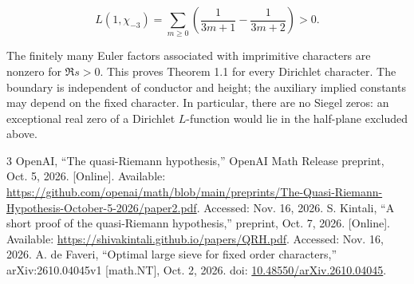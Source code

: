 \documentclass[reqno,a4paper,11pt]{amsart}
\begin{document}
\[
L\left( 1,{\chi }_{-3}\right) =\sum _{m\ge 0} \left( \frac{1}{3m+1}-\frac{1}{3m+2}\right) >0.
\]

The finitely many Euler factors associated with imprimitive characters are nonzero for $\Re s>0$. This proves Theorem 1.1 for every Dirichlet character. The boundary is independent of conductor and height; the auxiliary implied constants may depend on the fixed character. In particular, there are no Siegel zeros: an exceptional real zero of a Dirichlet $L$-function would lie in the half-plane excluded above.
\begin{thebibliography}{3}
OpenAI, ``The quasi-Riemann hypothesis,'' OpenAI Math Release preprint,
Oct. 5, 2026. [Online]. Available:
\url{https://github.com/openai/math/blob/main/preprints/The-Quasi-Riemann-Hypothesis-October-5-2026/paper2.pdf}.
Accessed: Nov. 16, 2026.
S. Kintali, ``A short proof of the quasi-Riemann hypothesis,'' preprint,
Oct. 7, 2026. [Online]. Available:
\url{https://shivakintali.github.io/papers/QRH.pdf}.
Accessed: Nov. 16, 2026.
A. de Faveri, ``Optimal large sieve for fixed order characters,''
arXiv:2610.04045v1 [math.NT], Oct. 2, 2026.
doi: \href{https://doi.org/10.48550/arXiv.2610.04045}{10.48550/arXiv.2610.04045}.
\end{thebibliography}
\end{document}
